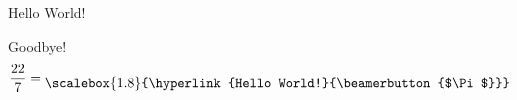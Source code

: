 \documentclass{beamer}
\begin{document}
\begin{frame}{Hello World!}
\hyperlink{Goodbye!}{}
\end{frame}

\begin{frame}{Goodbye!}
\begin{equation}
\dfrac{22}{7} = \raisebox{-.3\baselineskip}{\scalebox{1.8}{\hyperlink{Hello World!}{\beamerbutton{$\Pi$}}}}
\end{equation}
\end{frame}
\end{document}
